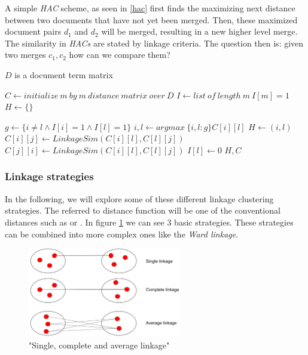     A simple \emph{HAC} scheme, as seen in \ref{hac} first finds the maximizing next distance between two documents that have not yet been merged. Then, these maximized document pairs $d_1$ and $d_2$ will be merged, resulting in a new higher level merge. The similarity in \emph{HACs} are stated by linkage criteria. The question then is: given two merges $c_1,c_2$ how can we compare them?

    \begin{algorithm}[H]
    \begin{algorithmic}[1]
      \caption{$D$ is a document term matrix}\label{hac}
        \State $C \gets initialize\:m\:by\:m\:distance\:matrix\:over\:D$
        \State $I \gets list\:of\:length\:m\:I[m]=1$ 
        \State $H \gets \{\}$ 

          \State $g \gets \{i\not=l \wedge I[i]=1 \wedge I[l]=1 \}$
          \State $i,l \gets  argmax\:\{ i,l : g\} C[i][l]$ 
          \State $H \gets (i,l)$ 
           
            \State $C[i][j] \gets LinkageSim(C[i][l], C[l][j])$
            \State $C[j][i] \gets LinkageSim(C[i][l], C[l][j])$
          \EndFor
          \State $I[l] \gets 0$ 
        \EndFor
        \State \Return $H, C$
      \EndFunction
    \end{algorithmic}
    \end{algorithm}

    \subsubsection{Linkage strategies}
    \label{sec:linkages}

    In the following, we will explore some of these different linkage clustering strategies.
    The referred to distance function will be one of the conventional distances such as \cosine{} or \euclid{}. In figure \ref{linkage_strategy} we can see 3 basic strategies. These strategies can be combined into more complex ones like the \emph{Ward linkage}.

      \begin{figure}[h!]
        \centering
          \includegraphics[width=0.6\textwidth]{linkage_strategy.png}
          \caption{"Single, complete and average linkage"}
          \label{linkage_strategy}
      \end{figure}

